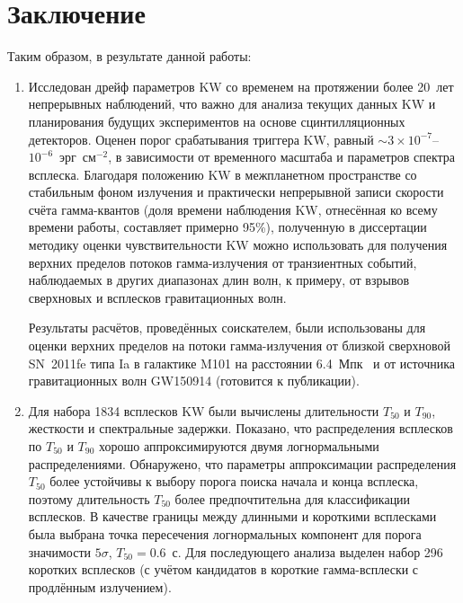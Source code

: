 \chapter*{Заключение}						%

Таким образом, в результате данной работы:
\begin{enumerate}
 
\item Исследован дрейф параметров KW со временем на протяжении более 20~лет непрерывных наблюдений,
    что важно для анализа текущих данных KW и планирования будущих экспериментов 
    на основе сцинтилляционных детекторов.
    Оценен порог срабатывания триггера KW, равный $\sim 3\times10^{-7}$--$10^{-6}$~эрг~см$^{-2}$,
    в зависимости от временного масштаба и параметров спектра всплеска. 
    Благодаря положению KW в межпланетном пространстве со стабильным 
    фоном излучения и практически непрерывной записи скорости счёта гамма-квантов 
    (доля времени наблюдения KW, отнесённая ко всему времени работы, составляет 
    примерно 95\%), полученную в диссертации методику оценки чувствительности KW
    можно использовать для получения верхних пределов потоков гамма-излучения  
    от транзиентных событий, наблюдаемых в других диапазонах длин волн, к примеру, 
    от взрывов сверхновых и всплесков гравитационных волн.
    
    Результаты расчётов, проведённых соискателем, были использованы для оценки верхних 
    пределов на потоки гамма-излучения от близкой сверхновой SN~2011fe типа Ia в 
    галактике M101 на расстоянии 6.4~Мпк~\citep{Margutti_2012ApJ} и от источника гравитационных
    волн GW150914 (готовится к публикации).
    
\item Для набора 1834 всплесков KW были вычислены длительности $T_{50}$ и $T_{90}$, жесткости 
    и спектральные задержки. Показано, что распределения 
    всплесков по $T_{50}$ и $T_{90}$ хорошо аппроксимируются двумя логнормальными 
    распределениями. Обнаружено, что параметры аппроксимации распределения $T_{50}$ 
    более устойчивы к выбору порога поиска начала и конца всплеска, поэтому длительность 
    $T_{50}$ более предпочтительна для классификации всплесков. В качестве границы между 
    длинными и короткими всплесками была выбрана точка пересечения логнормальных компонент 
    для порога значимости $5\sigma$, $T_{50} = 0.6$~с. 
    Для последующего анализа выделен набор 296 коротких всплесков (с учётом кандидатов 
    в короткие гамма-всплески с продлённым излучением). 
      

\end{enumerate}
